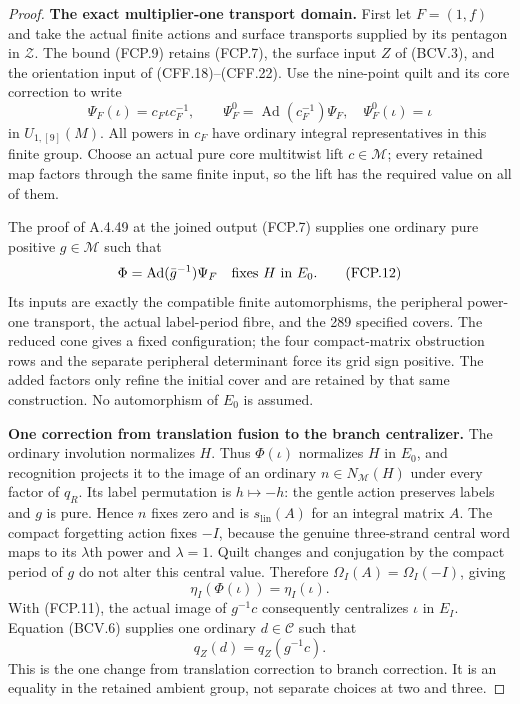 \begin{proof}
\par\medskip\noindent\textbf{The exact multiplier-one transport domain.}\quad
First let $F=(1,f)$ and take the actual finite actions and
surface transports supplied by its pentagon in $\mathcal Z$.
The bound (FCP.9) retains (FCP.7), the surface input $Z$
of (BCV.3), and the orientation input of
(CFF.18)--(CFF.22).
Use the nine-point quilt and its core correction to write
\[
 \Psi_F(\iota)=c_F\iota c_F^{-1},\qquad
 \Psi_F^0=\operatorname{Ad}(c_F^{-1})\Psi_F,
                       \quad\Psi_F^0(\iota)=\iota
                                                               \tag{FCP.11}
\]
in $U_{1,[9]}(M)$.
All powers in $c_F$ have ordinary integral representatives
in this finite group.  Choose an actual pure core
multitwist lift $c\in\mathcal M$; every retained map factors
through the same finite input, so the lift has the required
value on all of them.

The proof of A.4.49 at the joined output (FCP.7) supplies
one ordinary pure positive $g\in\mathcal M$ such that
\[
       \Phi=\operatorname{Ad}(\bar g^{-1})\Psi_F
                         \quad\hbox{fixes }H\hbox{ in }E_0.
                                                               \tag{FCP.12}
\]
Its inputs are exactly the compatible finite automorphisms,
the peripheral power-one transport, the actual label-period
fibre, and the 289 specified covers.  The reduced cone
gives a fixed configuration; the four compact-matrix
obstruction rows and the separate peripheral determinant
force its grid sign positive.  The added factors only
refine the initial cover and are retained by that same
construction.  No automorphism of $E_0$ is assumed.

\par\medskip\noindent\textbf{One correction from translation fusion to the branch centralizer.}\quad
The ordinary involution normalizes $H$.  Thus $\Phi(\iota)$
normalizes $H$ in $E_0$, and recognition projects it to
the image of an ordinary $n\in N_{\mathcal M}(H)$ under
every factor of $q_R$.
Its label permutation is $h\mapsto-h$: the gentle action
preserves labels and $g$ is pure.  Hence $n$ fixes zero
and is $s_{\mathrm{lin}}(A)$ for an integral matrix $A$.
The compact forgetting action fixes $-I$, because the
genuine three-strand central word maps to its $\lambda$th
power and $\lambda=1$.  Quilt changes and conjugation by
the compact period of $g$ do not alter this central value.
Therefore $\Omega_I(A)=\Omega_I(-I)$, giving
\[
                         \eta_I(\Phi(\iota))=\eta_I(\iota).
                                                               \tag{FCP.13}
\]
With (FCP.11), the actual image of $g^{-1}c$ consequently
centralizes $\iota$ in $E_I$.
Equation (BCV.6) supplies one ordinary $d\in\mathcal C$
such that
\[
                         q_Z(d)=q_Z(g^{-1}c).
                                                               \tag{FCP.14}
\]
This is the one change from translation correction to branch
correction.  It is an equality in the retained ambient group,
not separate choices at two and three.


\end{proof}
